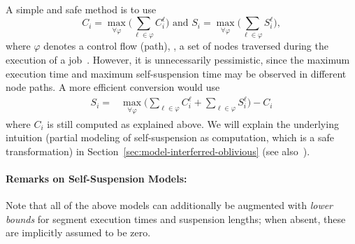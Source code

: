 %
%
%
A simple and safe method is to use
\begin{equation*} 
C_i =  \max_{\forall \varphi} \Big(  \sum_{\ell \in \varphi} C_i^\ell   \Big)        \mbox{   and }
S_i =  \max_{\forall \varphi} \Big(  \sum_{\ell \in \varphi} S_i^\ell   \Big),
\end{equation*}
where $\varphi$ denotes a control flow (path), \ie, a set of nodes traversed during the execution of a job~\cite{RTAS-AudsleyB04,bletsas:thesis}. However, it is unnecessarily pessimistic, since the maximum execution time and maximum self-suspension 
time may be observed in different node paths. A more efficient conversion would use
\begin{align} 
S_i =  &\max_{\forall \varphi} \Big(  \sum_{\ell \in \varphi} C_i^\ell + \sum_{\ell \in \varphi} S_i^\ell   \Big)  - C_i  \nonumber
\end{align}
where $C_i$ is still computed as explained above. We will explain the underlying intuition  (partial modeling of self-suspension as computation, which is a safe transformation) 
in Section~\ref{sec:model-interferred-oblivious} (see also~\cite{RTAS-AudsleyB04,BletsasReport2015}).

\paragraph{Remarks on Self-Suspension Models:} 

Note that all of the above models can additionally be augmented with \emph{lower bounds} for segment execution times and suspension 
lengths; when absent, these are implicitly assumed to be zero.


